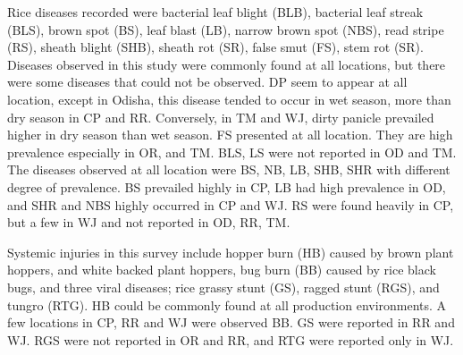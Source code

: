 Rice diseases recorded were bacterial leaf blight (BLB), bacterial leaf streak (BLS), brown spot (BS), leaf blast (LB), narrow brown spot (NBS), read stripe (RS), sheath blight (SHB), sheath rot (SR), false smut (FS), stem rot (SR). Diseases observed in this study were commonly found at all locations, but there were some diseases that could not be observed. DP seem to appear at all location, except in Odisha, this disease tended to occur in wet season, more than dry season in CP and RR. Conversely, in TM and WJ, dirty panicle prevailed higher in dry season than wet season. FS presented at all location. They are high prevalence especially in OR, and TM.  BLS, LS were not reported in OD and TM. The diseases observed at all location were BS, NB, LB, SHB, SHR with different degree of prevalence.  BS prevailed highly in CP, LB had high prevalence in OD, and SHR and NBS highly occurred in CP and WJ. RS were found heavily in CP, but a few in WJ and not reported in OD, RR, TM.

Systemic injuries in this survey include hopper burn (HB) caused by brown plant hoppers, and white backed plant hoppers, bug burn (BB) caused by rice black bugs, and three viral diseases; rice grassy stunt (GS), ragged stunt (RGS), and tungro (RTG). HB could be commonly found at all production environments.  A few locations in CP, RR and WJ were observed BB. GS were reported in RR and WJ. RGS were not reported in OR and RR, and RTG were reported only in WJ.

